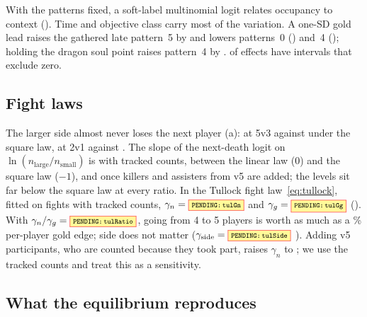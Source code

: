 With the patterns fixed, a soft-label multinomial logit relates occupancy to context ().
Time and objective class carry most of the variation.
A one-SD gold lead raises the gathered late pattern~5 by   and lowers patterns~0 () and~4 (); holding the dragon soul point raises pattern~4 by  .
 of  effects have intervals that exclude zero.

\subsection{Fight laws}
\label{sec:fights}


The larger side almost never loses the next player (a):  at 5v3 against  under the square law,  at 2v1 against .
The slope of the next-death logit on $\ln(n_{\mathrm{large}}/n_{\mathrm{small}})$ is   with tracked counts, between the linear law (0) and the square law ($-1$), and   once killers and assisters from v5 are added; the levels sit far below the square law at every ratio.
In the Tullock fight law~\eqref{eq:tullock}, fitted on  fights with tracked counts, $\gamma_n=\V{tulGn}$  and $\gamma_g=\V{tulGg}$  ().
With $\gamma_n/\gamma_g=\V{tulRatio}$, going from 4 to 5 players is worth as much as a \% per-player gold edge; side does not matter ($\gamma_{\mathrm{side}}=\V{tulSide}$ ).
Adding v5 participants, who are counted because they took part, raises $\gamma_n$ to ; we use the tracked counts and treat this as a sensitivity.

\subsection{What the equilibrium reproduces}
\label{sec:qre}


